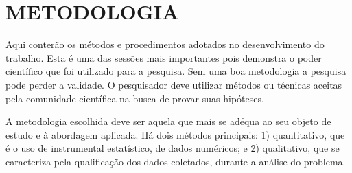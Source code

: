 \section{METODOLOGIA}
Aqui conterão os métodos e procedimentos adotados no desenvolvimento do trabalho. Esta é uma das sessões mais importantes pois demonstra o poder científico que foi utilizado para a pesquisa. Sem uma boa metodologia a pesquisa pode perder a validade. O pesquisador deve utilizar métodos ou técnicas aceitas pela comunidade científica na busca de provar suas hipóteses.

A metodologia escolhida deve ser aquela que mais se adéqua ao seu objeto de estudo e à abordagem aplicada. Há dois métodos principais: 1) quantitativo, que é o uso de instrumental estatístico, de dados numéricos; e 2) qualitativo, que se caracteriza pela qualificação dos dados coletados, durante a análise do problema.